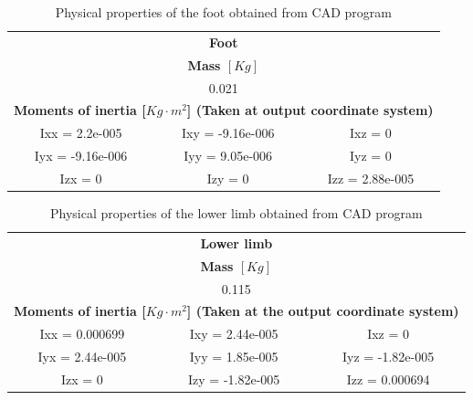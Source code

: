 \begin{table}[htbp]
\caption{Physical properties of the foot obtained from CAD program}
\begin{center}
\begin{tabular}{c|l|l}
\multicolumn{ 3}{c}{\Large \textbf{Foot}} \\
\multicolumn{ 3}{c}{\textbf{Mass $[Kg]$}} \\ \hline
\multicolumn{ 3}{c}{0.021} \\ \hline
\multicolumn{ 3}{c}{\textbf{Moments of inertia [$Kg \cdot m^2$] (Taken at output coordinate system)}} \\ \hline
Ixx = 2.2e-005 & \multicolumn{1}{c|}{Ixy = -9.16e-006} & \multicolumn{1}{c}{Ixz = 0} \\ \hline
Iyx = -9.16e-006 & \multicolumn{1}{c|}{Iyy = 9.05e-006} & \multicolumn{1}{c}{Iyz = 0} \\ \hline
Izx = 0 & \multicolumn{1}{c|}{Izy = 0} & \multicolumn{1}{c}{Izz = 2.88e-005} \\ 
\end{tabular}
\end{center}
\label{tab:foot_physical_properties}
\end{table}


\begin{table}[htbp]
\caption{Physical properties of the lower limb obtained from CAD program}
\begin{center}
\begin{tabular}{c|l|l}
\multicolumn{ 3}{c}{\Large \textbf{Lower limb}} \\
\multicolumn{ 3}{c}{\textbf{Mass $[Kg]$}} \\ \hline
\multicolumn{ 3}{c}{0.115} \\ \hline
\multicolumn{ 3}{c}{\textbf{Moments of inertia [$Kg \cdot m^2$] (Taken at the output coordinate system)}} \\ \hline
Ixx = 0.000699 & \multicolumn{1}{c|}{Ixy = 2.44e-005} & \multicolumn{1}{c}{Ixz = 0} \\ \hline
Iyx = 2.44e-005 & \multicolumn{1}{c|}{Iyy = 1.85e-005} & \multicolumn{1}{c}{Iyz = -1.82e-005} \\ \hline
Izx = 0 & \multicolumn{1}{c|}{Izy = -1.82e-005} & \multicolumn{1}{c}{Izz = 0.000694} \\ 
\end{tabular}
\end{center}
\label{tab:lower_limb_physical_properties}
\end{table}


